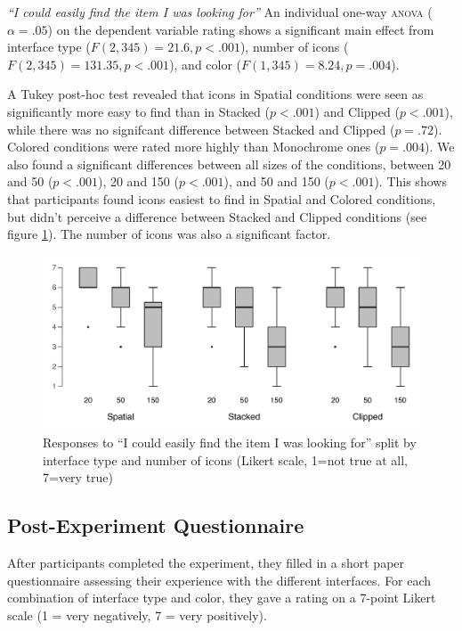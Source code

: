\documentclass[nobib]{tufte-book} %
\begin{document}
\emph{``I could easily find the item I was looking for''}
An individual one-way \textsc{anova} ($\alpha = .05$) on the dependent variable rating shows a significant main effect from interface type ($F(2,345) = 21.6, p < .001$), number of icons ($F(2,345) = 131.35, p < .001$), and color ($F(1,345) = 8.24, p = .004$).

A Tukey post-hoc test revealed that icons in Spatial conditions were seen as significantly more easy to find than in Stacked ($p < .001$) and Clipped ($p < .001$), while there was no signifcant difference between Stacked and Clipped ($p = .72$). Colored conditions were rated more highly than Monochrome ones ($p = .004$). We also found a significant differences between all sizes of the conditions, between 20 and 50 ($p < .001$), 20 and 150 ($p < .001$), and 50 and 150 ($p < .001$). This shows that participants found icons easiest to find in Spatial and Colored conditions, but didn't perceive a difference between Stacked and Clipped conditions (see figure \ref{fig:easyfind}). The number of icons was also a significant factor.

\begin{figure}
\includegraphics{postcon-easy.pdf}
\caption{Responses to ``I could easily find the item I was looking for'' split by interface type and number of icons (Likert scale, 1=not true at all, 7=very true)}
\label{fig:easyfind}
\end{figure}


\subsection{Post-Experiment Questionnaire}
After participants completed the experiment, they filled in a short paper questionnaire assessing their experience with the different interfaces. For each combination of interface type and color, they gave a rating on a 7-point Likert scale (1 = very negatively, 7 = very positively).
\end{document}
